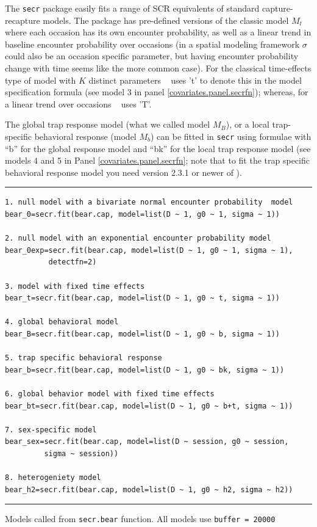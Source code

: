 The \mbox{\tt secr} package easily fits a range of SCR equivalents of standard capture-recapture models.
The package has pre-defined versions of the classic
model $M_{t}$ where each
occasion has its own encounter
 probability, as well as a linear
trend in baseline encounter probability 
over occasions (in a spatial modeling framework $\sigma$ could also be
an occasion specific parameter, but having encounter probability 
 change with time seems like the more common case). For the classical
time-effects type of model with $K$ distinct parameters \secr~ uses 't' to denote
this in the model specification formula (see model 3 in 
panel \ref{covariates.panel.secrfn}); whereas, for a linear
trend over occasions \secr~ uses 'T'.

The global trap response model (what we called model $M_{B}$), 
or a local trap-specific behavioral response (model $M_{b}$)
can be fitted in \mbox{\tt secr} using formulae with
 ``b'' for the global response model and
 ``bk'' for the local trap response model
(see models 4 and 5 in 
Panel \ref{covariates.panel.secrfn}; note that to fit the trap specific behavioral response model you need version 2.3.1 or newer of \secr).

\begin{panel}[htp]
\centering
\rule[0.1in]{\textwidth}{.03in}
{\small
\begin{verbatim}
1. null model with a bivariate normal encounter probability  model
bear_0=secr.fit(bear.cap, model=list(D ~ 1, g0 ~ 1, sigma ~ 1))

2. null model with an exponential encounter probability model
bear_0exp=secr.fit(bear.cap, model=list(D ~ 1, g0 ~ 1, sigma ~ 1),
          detectfn=2)

3. model with fixed time effects
bear_t=secr.fit(bear.cap, model=list(D ~ 1, g0 ~ t, sigma ~ 1))

4. global behavioral model
bear_B=secr.fit(bear.cap, model=list(D ~ 1, g0 ~ b, sigma ~ 1))

5. trap specific behavioral response
bear_b=secr.fit(bear.cap, model=list(D ~ 1, g0 ~ bk, sigma ~ 1))

6. global behavior model with fixed time effects
bear_bt=secr.fit(bear.cap, model=list(D ~ 1, g0 ~ b+t, sigma ~ 1))

7. sex-specific model
bear_sex=secr.fit(bear.cap, model=list(D ~ session, g0 ~ session, 
         sigma ~ session))

8. heterogeniety model
bear_h2=secr.fit(bear.cap, model=list(D ~ 1, g0 ~ h2, sigma ~ h2))
\end{verbatim}
}

\rule[-0.1in]{\textwidth}{.03in}
\caption{
Models called from \mbox{\tt secr.bear} function. All models use \mbox{\tt buffer = 20000}}
\label{covariates.panel.secrfn}
\end{panel}


